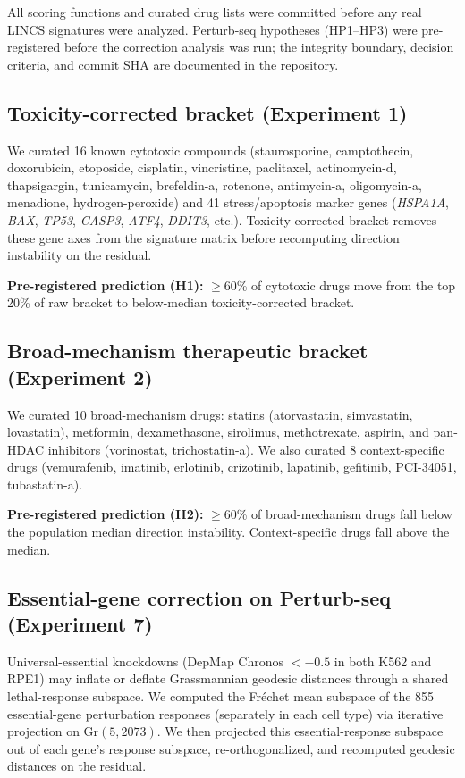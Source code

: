 \documentclass{article}
\begin{document}
All scoring functions and curated drug lists were committed before any real
LINCS signatures were analyzed. Perturb-seq hypotheses (HP1--HP3) were
pre-registered before the correction analysis was run; the integrity
boundary, decision criteria, and commit SHA are documented in the
repository.

\subsection{Toxicity-corrected bracket (Experiment 1)}

We curated 16 known cytotoxic compounds (staurosporine, camptothecin,
doxorubicin, etoposide, cisplatin, vincristine, paclitaxel, actinomycin-d,
thapsigargin, tunicamycin, brefeldin-a, rotenone, antimycin-a, oligomycin-a,
menadione, hydrogen-peroxide) and 41 stress/apoptosis marker genes
(\emph{HSPA1A}, \emph{BAX}, \emph{TP53}, \emph{CASP3}, \emph{ATF4},
\emph{DDIT3}, etc.). Toxicity-corrected bracket removes these gene axes from
the signature matrix before recomputing direction instability on the residual.

\textbf{Pre-registered prediction (H1):} $\geq$60\% of cytotoxic drugs move
from the top 20\% of raw bracket to below-median toxicity-corrected bracket.

\subsection{Broad-mechanism therapeutic bracket (Experiment 2)}

We curated 10 broad-mechanism drugs: statins (atorvastatin, simvastatin,
lovastatin), metformin, dexamethasone, sirolimus, methotrexate, aspirin,
and pan-HDAC inhibitors (vorinostat, trichostatin-a). We also curated 8
context-specific drugs (vemurafenib, imatinib, erlotinib, crizotinib,
lapatinib, gefitinib, PCI-34051, tubastatin-a).

\textbf{Pre-registered prediction (H2):} $\geq$60\% of broad-mechanism drugs
fall below the population median direction instability. Context-specific
drugs fall above the median.

\subsection{Essential-gene correction on Perturb-seq (Experiment 7)}

Universal-essential knockdowns (DepMap Chronos $< -0.5$ in both K562 and
RPE1) may inflate or deflate Grassmannian geodesic distances through a
shared lethal-response subspace. We computed the Fr\'echet mean subspace of
the 855 essential-gene perturbation responses (separately in each cell type)
via iterative projection on Gr$(5, 2073)$. We then projected this
essential-response subspace out of each gene's response subspace,
re-orthogonalized, and recomputed geodesic distances on the residual.
\end{document}
